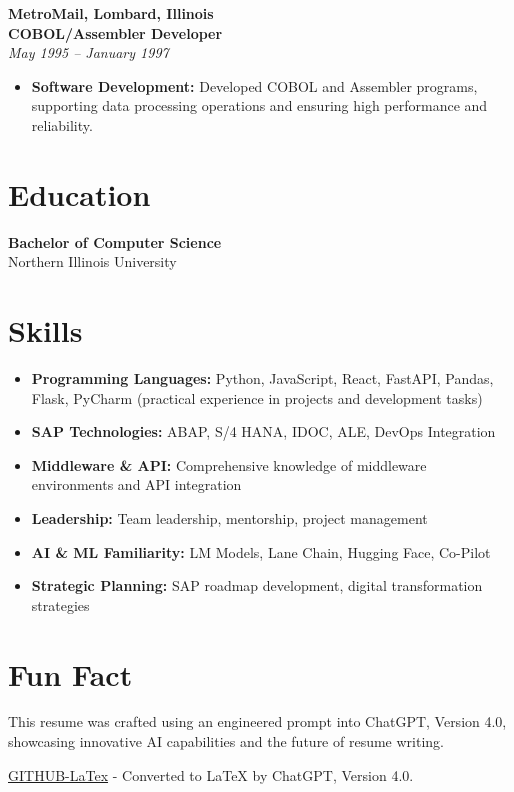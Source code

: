 \documentclass[a4paper,10pt]{article}
\begin{document}
\textbf{MetroMail, Lombard, Illinois} \\
\textbf{COBOL/Assembler Developer} \\
\textit{May 1995 – January 1997}
\begin{itemize}[leftmargin=*]
    \item \textbf{Software Development:} Developed COBOL and Assembler programs, supporting data processing operations and ensuring high performance and reliability.
\end{itemize}

\section*{Education}
\textbf{Bachelor of Computer Science} \\
Northern Illinois University

\section*{Skills}
\begin{itemize}[leftmargin=*]
    \item \textbf{Programming Languages:} Python, JavaScript, React, FastAPI, Pandas, Flask, PyCharm (practical experience in projects and development tasks)
    \item \textbf{SAP Technologies:} ABAP, S/4 HANA, IDOC, ALE, DevOps Integration
    \item \textbf{Middleware \& API:} Comprehensive knowledge of middleware environments and API integration
    \item \textbf{Leadership:} Team leadership, mentorship, project management
    \item \textbf{AI \& ML Familiarity:} LM Models, Lane Chain, Hugging Face, Co-Pilot
    \item \textbf{Strategic Planning:} SAP roadmap development, digital transformation strategies
\end{itemize}

\section*{Fun Fact}
This resume was crafted using an engineered prompt into ChatGPT, Version 4.0, showcasing innovative AI capabilities and the future of resume writing.

\href{https://github.com/WillyEth/ResumeWork/blob/main/LatexResume%20(11).txt}{\textcolor{headercolor}{GITHUB-LaTex}} - Converted to LaTeX by ChatGPT, Version 4.0.
\end{document}

